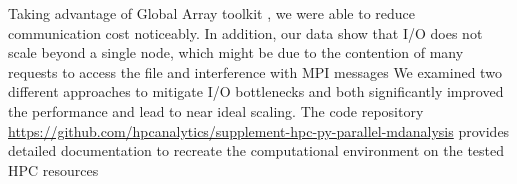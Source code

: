 Taking advantage of Global Array toolkit \cite{GA, GAiN}, we were able to reduce communication cost noticeably.
In addition, our data show that I/O does not scale beyond a single node, which might be due to the contention of many requests to access the file and interference with MPI messages \cite{VMD2013, Kevin2018} 
We examined two different approaches to mitigate I/O bottlenecks and both significantly improved the performance and lead to near ideal scaling.
The code repository \url{https://github.com/hpcanalytics/supplement-hpc-py-parallel-mdanalysis} provides detailed documentation to recreate the computational environment on the tested HPC resources